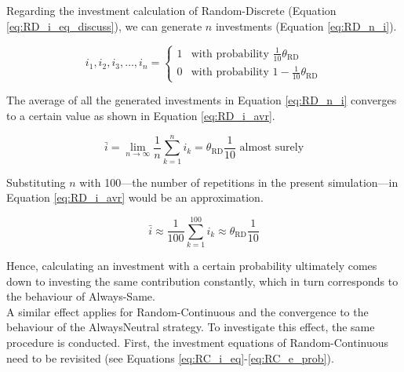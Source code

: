 \documentclass[11pt]{article}
\begin{document}
	\noindent
	Regarding the investment calculation of Random-Discrete (Equation \ref{eq:RD_i_eq_discuss}), we can generate $n$ investments (Equation \ref{eq:RD_n_i}).

	\begin{equation}
		i_1, i_2, i_3, \dots, i_n = 
		\begin{cases}
		1 & \text{with probability } \frac{1}{10} \theta_{\mathrm{RD}}\\
		0 & \text{with probability } 1 - \frac{1}{10} \theta_{\mathrm{RD}} 
		\end{cases}
		\label{eq:RD_n_i}
	\end{equation}

	\noindent
	The average of all the generated investments in Equation \ref{eq:RD_n_i} converges to a certain value as shown in Equation \ref{eq:RD_i_avr}.

	\begin{equation}
		\bar i = \lim_{n\to\infty} \frac{1}{n} \sum_{k=1}^{n} i_k = \theta_{\mathrm{RD}} \frac{1}{10} \text{ almost surely}
	\label{eq:RD_i_avr}
	\end{equation}

	\noindent
	Substituting $n$ with 100---the number of repetitions in the present simulation---in Equation \ref{eq:RD_i_avr} would be an approximation.

	\begin{equation}
		\bar i \approx \frac{1}{100} \sum_{k=1}^{100} i_k \approx \theta_{\mathrm{RD}} \frac{1}{10}
		\label{eq:RD_approx_i}
	\end{equation}

	\noindent
	Hence, calculating an investment with a certain probability ultimately comes down to investing the same contribution constantly, which in turn corresponds to the behaviour of Always-Same.\\

	\noindent
	A similar effect applies for Random-Continuous and the convergence to the behaviour of the AlwaysNeutral strategy.
	To investigate this effect, the same procedure is conducted.
	First, the investment equations of Random-Continuous need to be revisited (see Equations \ref{eq:RC_i_eq}-\ref{eq:RC_e_prob}).
\end{document}
